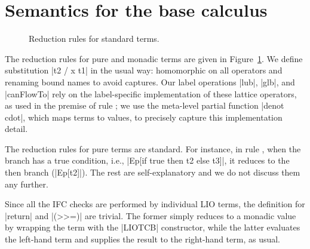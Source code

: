 \appendices
\section{Semantics for the base calculus}
\label{sec:app:sem}

\begin{figure}[b] %
\small
{}
\caption{Reduction rules for standard \lio{} terms.\label{fig:sos:rules}}
\end{figure}


The reduction rules for pure and monadic terms are given in
Figure~\ref{fig:sos:rules}. 
% 
We define substitution |{t2 / x } t1| in the
usual way: homomorphic on all operators and renaming bound names to avoid
captures.
%
Our label operations |lub|, |glb|, and |canFlowTo| rely on the label-specific
implementation of these lattice operators, as used in the premise of rule
; we use the meta-level partial function |denot cdot|, which
maps terms to values, to precisely capture this implementation detail.

%
The reduction rules for pure terms are standard. For instance, in rule
, when the branch has a true condition, i.e., |Ep[if
true then t2 else t3]|, it reduces to the then branch (|Ep[t2]|).  The
rest are self-explanatory and we do not discuss them any further. 
%

%
%
Since all the IFC checks are performed by individual LIO terms, the
definition for |return| and |(>>=)| are trivial.
The former simply reduces to a monadic value by wrapping the term with
the |LIOTCB| constructor, while the latter evaluates the left-hand
term and supplies the result to the right-hand term, as usual.


